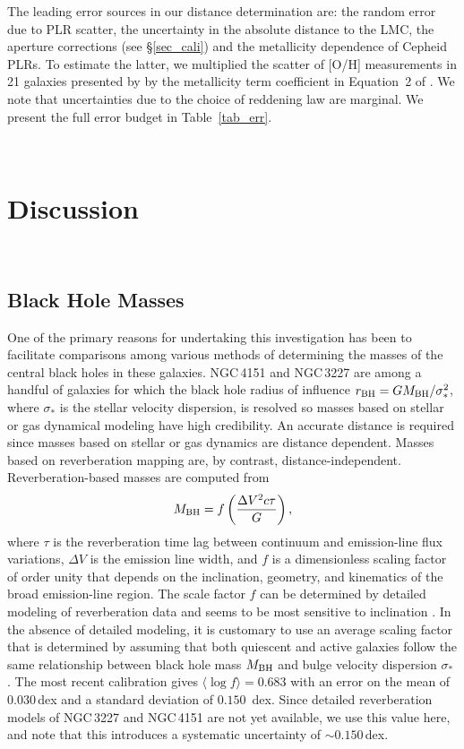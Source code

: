 \documentclass[twocolumn]{aastex63}
\begin{document}
The leading error sources in our distance determination are: the random error due to PLR scatter, the uncertainty in the absolute distance to the LMC, the aperture corrections (see \S\ref{sec_cali}) and the metallicity dependence of Cepheid PLRs. To estimate the latter, we multiplied the scatter of [O/H] measurements in 21 galaxies presented by \citet{Riess2016} by the metallicity term coefficient in Equation~2 of \citet{Riess2016}. We note that uncertainties due to the choice of reddening law are marginal. We present the full error budget in Table~\ref{tab_err}.

\ \par

\section{Discussion}

\ \par

\subsection{Black Hole Masses}

One of the primary reasons for undertaking this investigation has been to facilitate comparisons among various methods of determining the masses of the central black holes in these galaxies. NGC\,4151 and NGC\,3227 are among a handful of galaxies for which the black hole radius of influence $r_{\rm BH} = GM_{\rm BH}/\sigma_*^2$,  where $\sigma_*$ is the stellar velocity dispersion, is resolved so masses based on stellar or gas dynamical modeling have high credibility. An accurate distance is required since masses based on stellar or gas dynamics are distance dependent. Masses based on reverberation mapping are, by contrast, distance-independent. Reverberation-based masses are computed from
\begin{equation}
M_{\rm BH} = f \left( \frac{\Delta V^2 c \tau}{G} \right),
\end{equation}
where $\tau$ is the reverberation time lag between continuum and emission-line flux variations, $\Delta V$ is the emission line width, and $f$ is a dimensionless scaling factor of order unity that depends on the inclination, geometry, and kinematics of the broad emission-line region. The scale factor $f$ can be determined by detailed modeling of reverberation data \citep[e.g.,][]{Pancoast2014a,Grier2017,Horne2020} and seems to be most sensitive to inclination \citep{Grier2017}. In the absence of detailed modeling, it is customary to use an average scaling factor \citep{2004ApJ...615..645O} that is determined by assuming that both quiescent and active galaxies follow the same relationship between black hole mass $M_{\rm BH}$ and bulge velocity dispersion $\sigma_*$ \citep{Ferrarese2000,Gebhardt2000,Gultekin2009}. The most recent calibration gives $\langle \log f \rangle = 0.683$ \citep{Batiste2017} with an error on the mean of $0.030$\,dex and a standard deviation of $0.150$~dex. Since detailed reverberation models of NGC\,3227 and NGC\,4151 are not yet available, we use this value here, and note that this introduces a systematic uncertainty of $\sim0.150$\,dex.
\end{document}
